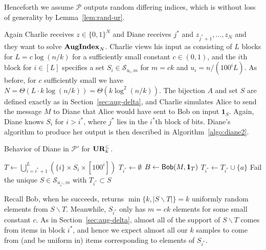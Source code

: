 Henceforth we assume $\mathcal P$ outputs random differing indices, which is without loss of generality by Lemma~\ref{lem:rand-ur}.


Again Charlie receives $z\in\{0,1\}^N$ and Diane receives $j^*$ and $z_{j^*+1},\ldots,z_N$ and they want to solve $\mathbf{AugIndex}_N$. Charlie views his input as consisting of $L$ blocks for $L = c\log(n/k)$ for a sufficiently small constant $c\in(0,1)$, and the $i$th block for $i\in[L]$ specifies a set $S_i \in \mathcal S_{u_i,m}$ for $m = ck$ and $u_i = n/(100^i L)$. As before, for $c$ sufficiently small we have $N = \Theta(L\cdot k\log(n/k)) = \Theta(k\log^2(n/k))$. The bijection $A$ and set $S$ are defined exactly as in Section~\ref{sec:aug-delta}, and Charlie simulates Alice to send the message $M$ to Diane that Alice would have sent to Bob on input $\mathbf{1}_S$. Again, Diane knows $S_i$ for $i>i^*$, where $j^*$ lies in the $i^*$th block of bits. Diane's algorithm to produce her output is then described in Algorithm~\ref{algo:diane2}.

\begin{algorithm}%
  \caption{Behavior of Diane in $\mathcal P'$ for $\mathbf{UR}_k^\subset$.} \label{algo:diane2}
  \begin{algorithmic}[1]
    \State $T \leftarrow \bigcup_{i=i^*+1}^L (\{i\} \times S_i \times [100^i])$
    \State $T_{i^*}\leftarrow \emptyset$
    \State $B\leftarrow \mathsf{Bob}(M, \mathbf{1}_T)$
        \State $T_{i^*} \leftarrow T_{i^*}\cup \{a\}$
      \EndIf
    \EndFor
      \State \Return \textsf{Fail}
    \Else
      \State \Return the unique $S\in \mathcal S_{u_{i^*},m}$ with $T_{i^*}\subset S$ 
    \EndIf
    \EndProcedure
  \end{algorithmic}
\end{algorithm}

Recall Bob, when he succeeds, returns $\min\{k, |S\backslash T|\} = k$ uniformly random elements from $S\backslash T$. Meanwhile, $S_{i^*}$ only has $m = ck$ elements for some small constant $c$. As in Section~\ref{sec:aug-delta}, almost all of the support of $S\backslash T$ comes from items in block $i^*$, and hence we expect almost all our $k$ samples to come from (and be uniform in) items corresponding to elements of $S_{i^*}$. 


